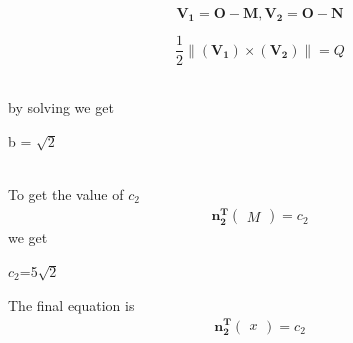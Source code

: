 \documentclass[10pt, a4paper]{article}
\providecommand{\norm}[1]{\left\lVert#1\right\rVert}
\newcommand{\myvec}[1]{\ensuremath{\begin{pmatrix}#1\end{pmatrix}}}
\let\vec\mathbf
\begin{document}
\begin{equation}
\vec{V_1}=\vec{O}-\vec{M},
\vec{V_2}=\vec{O}-\vec{N}
\end{equation}
\begin{center}
\textbf{$$ \frac{1}{2}\norm{(\vec{V_1}) \times  (\vec{V_2})} =Q  $$} 
\end{center}\label{eq-7}
\
\\by solving we get 
\begin{center}
b = $\sqrt{2}$
\end{center} 
\
\\To get the value of  $c_2$
\begin{eqnarray}
\vec{n_2^T}\myvec{M}=c_2
\end{eqnarray}
we get
\begin{center}
$c_2$=5$\sqrt{2}$
\end{center}
\begin{center}
\end{center}
The final equation is
\begin{eqnarray}
 \vec{n_2^T}\myvec{x}=c_2
\end{eqnarray}
\end{document}
